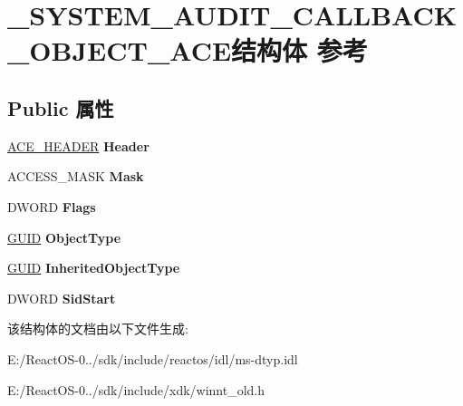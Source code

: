 \hypertarget{struct___s_y_s_t_e_m___a_u_d_i_t___c_a_l_l_b_a_c_k___o_b_j_e_c_t___a_c_e}{}\section{\+\_\+\+S\+Y\+S\+T\+E\+M\+\_\+\+A\+U\+D\+I\+T\+\_\+\+C\+A\+L\+L\+B\+A\+C\+K\+\_\+\+O\+B\+J\+E\+C\+T\+\_\+\+A\+C\+E结构体 参考}
\label{struct___s_y_s_t_e_m___a_u_d_i_t___c_a_l_l_b_a_c_k___o_b_j_e_c_t___a_c_e}
\subsection*{Public 属性}
\begin{DoxyCompactItemize}
\item 
\mbox{\label{struct___s_y_s_t_e_m___a_u_d_i_t___c_a_l_l_b_a_c_k___o_b_j_e_c_t___a_c_e_ac5a11e30efa7e2d6ff2bf21028eaa5e1}} 
\hyperlink{struct___a_c_e___h_e_a_d_e_r}{A\+C\+E\+\_\+\+H\+E\+A\+D\+ER} {\bfseries Header}
\item 
\mbox{\label{struct___s_y_s_t_e_m___a_u_d_i_t___c_a_l_l_b_a_c_k___o_b_j_e_c_t___a_c_e_ab66e28d5995ddb28546328ebd778a531}} 
A\+C\+C\+E\+S\+S\+\_\+\+M\+A\+SK {\bfseries Mask}
\item 
\mbox{\label{struct___s_y_s_t_e_m___a_u_d_i_t___c_a_l_l_b_a_c_k___o_b_j_e_c_t___a_c_e_a4a0885bd34726e78db0765eb5cfedd19}} 
D\+W\+O\+RD {\bfseries Flags}
\item 
\mbox{\label{struct___s_y_s_t_e_m___a_u_d_i_t___c_a_l_l_b_a_c_k___o_b_j_e_c_t___a_c_e_add1d4dc3a266c470dec40a4a8827296f}} 
\hyperlink{interface_g_u_i_d}{G\+U\+ID} {\bfseries Object\+Type}
\item 
\mbox{\label{struct___s_y_s_t_e_m___a_u_d_i_t___c_a_l_l_b_a_c_k___o_b_j_e_c_t___a_c_e_ab928ccfd481d8af5622c6cc1ac40f694}} 
\hyperlink{interface_g_u_i_d}{G\+U\+ID} {\bfseries Inherited\+Object\+Type}
\item 
\mbox{\label{struct___s_y_s_t_e_m___a_u_d_i_t___c_a_l_l_b_a_c_k___o_b_j_e_c_t___a_c_e_a4d4b9b49d93e5124d6ccf8e900cca8fc}} 
D\+W\+O\+RD {\bfseries Sid\+Start}
\end{DoxyCompactItemize}


该结构体的文档由以下文件生成\+:\begin{DoxyCompactItemize}
\item 
E\+:/\+React\+O\+S-\/0../sdk/include/reactos/idl/ms-\/dtyp.\+idl\item 
E\+:/\+React\+O\+S-\/0../sdk/include/xdk/winnt\+\_\+old.\+h\end{DoxyCompactItemize}
